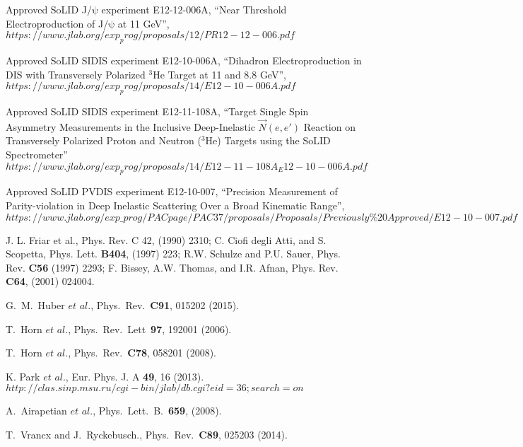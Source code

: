 \begin{thebibliography}{}
  Approved SoLID J/$\mathrm{\psi}$ experiment E12-12-006A,
  ``Near Threshold Electroproduction of J/$\mathrm{\psi}$ at 11 GeV'',\\
$https://www.jlab.org/exp_prog/proposals/12/PR12-12-006.pdf$

  Approved SoLID SIDIS experiment E12-10-006A,
  ``Dihadron Electroproduction in DIS with  Transversely Polarized
  $\mathrm{^{3}He}$ Target at 11 and 8.8 GeV'',\\
$https://www.jlab.org/exp_prog/proposals/14/E12-10-006A.pdf$

   Approved SoLID SIDIS experiment E12-11-108A,
``Target Single Spin Asymmetry Measurements in the Inclusive Deep-Inelastic
$\vec{N}(e,e')$ Reaction on Transversely Polarized Proton and Neutron
($\mathrm{^{3}He}$) Targets using the SoLID Spectrometer''\\
$https://www.jlab.org/exp_prog/proposals/14/E12-11-108A_E12-10-006A.pdf$

  Approved SoLID PVDIS experiment E12-10-007,
  ``Precision Measurement of Parity-violation in Deep Inelastic Scattering Over
  a Broad Kinematic Range'',\\
  $https://www.jlab.org/exp\_prog/PACpage/PAC37/proposals/Proposals/Previously\%20Approved/E12-10-007.pdf$

J. L. Friar et al., Phys. Rev. C 42, (1990) 2310; C. Ciofi
degli Atti, and S. Scopetta, Phys. Lett. {\bf B404}, (1997) 223; R.W. Schulze
and P.U. Sauer, Phys. Rev. {\bf C56} (1997) 2293; F. Bissey, A.W. Thomas, and
I.R. Afnan, Phys. Rev. {\bf C64}, (2001) 024004.

 G.~M.~Huber $\textit{et}$ $\textit{al}$.,
Phys.~Rev.~\textbf{C91}, 015202 (2015).

 T.~Horn $\textit{et}$ $\textit{al}$.,
Phys.~Rev.~Lett~\textbf{97}, 192001 (2006).

 T.~Horn $\textit{et}$ $\textit{al}$.,
Phys.~Rev.~\textbf{C78}, 058201 (2008).

 K. Park $\textit{et}$ $\textit{al}$.,
Eur. Phys. J. A \textbf{49}, 16 (2013).\\
$http://clas.sinp.msu.ru/cgi-bin/jlab/db.cgi?eid=36;search=on$

 A.~Airapetian $\textit{et}$ $\textit{al}$.,
Phys.~Lett.~B.~\textbf{659}, (2008).

 T.~Vrancx and J.~Ryckebusch., Phys.~Rev.~\textbf{C89},
025203 (2014).


\end{thebibliography}
